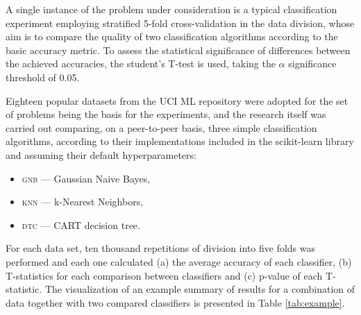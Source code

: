 \documentclass[12pt,a4paper]{report}
\begin{document}
A single instance of the problem under consideration is a typical classification experiment employing stratified 5-fold cross-validation in the data division, whose aim is to compare the quality of two classification algorithms according to the basic accuracy metric. To assess the statistical significance of differences between the achieved accuracies, the student's T-test is used, taking the $\alpha$ significance threshold of 0.05.


Eighteen popular datasets from the UCI ML repository were adopted for the set of problems being the basis for the experiments, and the research itself was carried out comparing, on a peer-to-peer basis, three simple classification algorithms, according to their implementations included in the scikit-learn library and assuming their default hyperparameters:


\begin{itemize}
	\item \textsc{gnb} --- Gaussian Naive Bayes,
	\item \textsc{knn} --- k-Nearest Neighbors,
	\item \textsc{dtc} --- CART decision tree.
\end{itemize}

For each data set, ten thousand repetitions of division into five folds was performed and each one calculated (a) the average accuracy of each classifier, (b) T-statistics for each comparison between classifiers and (c) p-value of each T-statistic. The visualization of an example summary of results for a combination of data together with two compared classifiers is presented in Table \ref {tab:example}.

\end{document}
